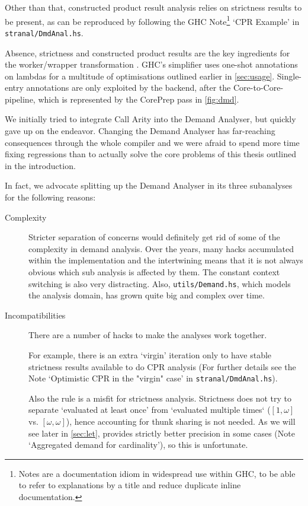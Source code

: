 Other than that, constructed product result analysis relies on strictness results to be present, as can be reproduced by following the GHC Note\footnote{Notes are a documentation idiom in widespread use within GHC, to be able to refer to explanations by a title and reduce duplicate inline documentation.} `CPR Example' in \texttt{stranal/DmdAnal.hs}.

Absence, strictness and constructed product results are the key ingredients for the worker/wrapper transformation \parencite{ww}.
GHC's simplifier uses one-shot annotations on lambdas for a multitude of optimisations outlined earlier in \cref{sec:usage}.
Single-entry annotations are only exploited by the backend, after the Core-to-Core-pipeline, which is represented by the CorePrep pass in \cref{fig:dmd}.\medskip

We initially tried to integrate Call Arity into the Demand Analyser, but quickly gave up on the endeavor.
Changing the Demand Analyser has far-reaching consequences through the whole compiler and we were afraid to spend more time fixing regressions than to actually solve the core problems of this thesis outlined in the introduction.

In fact, we advocate splitting up the Demand Analyser in its three subanalyses for the following reasons:
\begin{description}
  \item[Complexity] 
    Stricter separation of concerns would definitely get rid of some of the complexity in demand analysis.
    Over the years, many hacks accumulated within the implementation and the intertwining means that it is not always obvious which sub analysis is affected by them.
    The constant context switching is also very distracting.
    Also, \texttt{utils/Demand.hs}, which models the analysis domain, has grown quite big and complex over time.
  \item[Incompatibilities]
    There are a number of hacks to make the analyses work together.

    For example, there is an extra `virgin' iteration only to have stable strictness results available to do CPR analysis (For further details see the Note `Optimistic CPR in the "virgin" case' in \texttt{stranal/DmdAnal.hs}).

    Also the  rule is a misfit for strictness analysis.
    Strictness does not try to separate `evaluated at least once' from `evaluated multiple times` (\eg $[1,\omega]$ vs. $[\omega,\omega]$), hence accounting for thunk sharing is not needed.
    As we will see later in \cref{sec:let},  provides strictly better precision in some cases (Note `Aggregated demand for cardinality'), so this is unfortunate.
\end{description}

